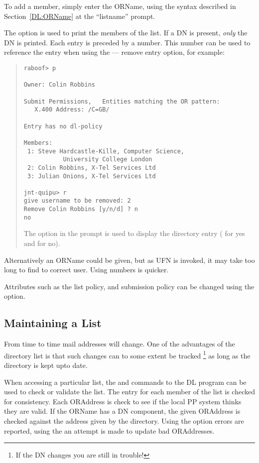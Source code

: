 To add a member, simply enter the ORName, using the syntax described
in Section~\ref{DL:ORName} at the ``listname'' prompt.

The  option is used to print the members of the list.  If a DN
is present, {\em only} the DN is printed.
Each entry is preceded by a number.  This number can be used to
reference the entry when using the  --- remove entry option,
for example:
\begin{quote}\begin{verbatim}
raboof> p

Owner: Colin Robbins

Submit Permissions,   Entities matching the OR pattern:
   X.400 Address: /C=GB/

Entry has no dl-policy

Members:
 1: Steve Hardcastle-Kille, Computer Science, 
		   University College London
 2: Colin Robbins, X-Tel Services Ltd
 3: Julian Onions, X-Tel Services Ltd

jnt-quipu> r
give username to be removed: 2
Remove Colin Robbins [y/n/d] ? n
no
\end{verbatim}
The  option in the \option{[y/n/d]} prompt is used to display the
directory entry ( for yes and  for no).
\end{quote}
Alternatively an ORName could be given, but as UFN is invoked, it may
take too long to find to correct user.  Using numbers is quicker.

Attributes such as the list policy, and submission policy can be
changed using the  option.

\subsection{Maintaining a List}
From time to time mail addresses will change.  One of the advantages
of the directory list is that such changes can to some extent be
tracked \footnote{If the DN changes you are still in trouble!} as long
as the directory is kept upto date.

When accessing a particular list, the  and 
commands to the DL program can be used to check or validate the list.
The entry for each member of the list is checked for consistency.
Each ORAddress is check to see if the local PP system thinks they are
valid. If the ORName has a DN component, the given ORAddress is
checked against the address given by the directory.  Using the
 option errors are reported, using the  an attempt
is made to update bad ORAddresses.

